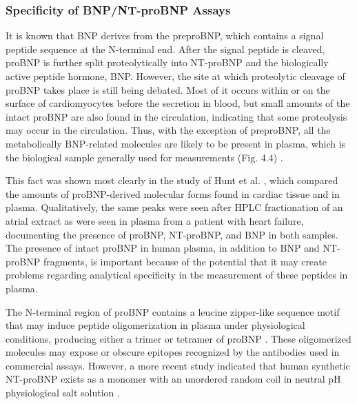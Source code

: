 \documentclass[14pt,a4paper,onecolumn]{extarticle}
\begin{document}
\subsubsection{ Specificity of BNP/NT-proBNP Assays}

It is known that BNP derives from the preproBNP, which contains a signal peptide
sequence at the N-terminal end. After the signal peptide is cleaved, proBNP is further
split proteolytically into NT-proBNP and the biologically active peptide hormone, BNP.
However, the site at which proteolytic cleavage of proBNP takes place is still being debated. Most of it occurs within or on the surface of cardiomyocytes before the secretion in
blood, but small amounts of the intact proBNP are also found in the circulation, indicating that some proteolysis may occur in the circulation. Thus, with the exception of
preproBNP, all the metabolically BNP-related molecules are likely to be present in plasma, which is the biological sample generally used for measurements (Fig. 4.4) \citep{bib276} \citep{bib277} \citep{bib278} \citep{bib279}.

This fact was shown most clearly in the study of Hunt et al. \citep{bib279}, which compared the
amounts of proBNP-derived molecular forms found in cardiac tissue and in plasma.
Qualitatively, the same peaks were seen after HPLC fractionation of an atrial extract
as were seen in plasma from a patient with heart failure, documenting the presence of
proBNP, NT-proBNP, and BNP in both samples. The presence of intact proBNP in human
plasma, in addition to BNP and NT-proBNP fragments, is important because of the
potential that it may create problems regarding analytical specificity in the measurement
of these peptides in plasma.

The N-terminal region of proBNP contains a leucine zipper-like sequence motif that
may induce peptide oligomerization in plasma under physiological conditions, producing either a trimer or tetramer of proBNP \citep{bib280}. These oligomerized molecules may
expose or obscure epitopes recognized by the antibodies used in commercial assays.
However, a more recent study indicated that human synthetic NT-proBNP exists as a
monomer with an unordered random coil in neutral pH physiological salt solution \citep{bib281}.
\end{document}
